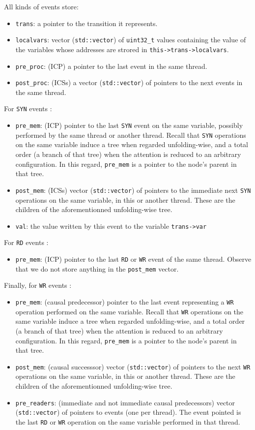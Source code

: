 \documentclass{llncs}
\begin{document}
All kinds of events store:
\begin{itemize}
\item
  \verb!trans!: a pointer to the transition it represents.
\item
  \verb!localvars!: vector (\verb!std::vector!) of \verb!uint32_t! values
  containing the value of the variables whose addresses are strored in
  \verb!this->trans->localvars!.
\item
  \verb!pre_proc!: (ICP) a pointer to the last event in the same thread.
\item
  \verb!post_proc!: (ICSs) a vector (\verb!std::vector!) of pointers to
  the next events in the same thread.
\end{itemize}
%
For \verb!SYN! events :
\begin{itemize}
\item
  \verb!pre_mem!: (ICP) pointer to the last \verb!SYN! event on the same
  variable, possibly performed by the same thread or another thread.
  Recall that \verb!SYN! operations on the same variable induce a tree when
  regarded unfolding-wise, and a total order (a branch of that tree) when
  the attention is reduced to an arbitrary configuration.
  In this regard, \verb!pre_mem! is a pointer to the node's parent in that
  tree.
\item
  \verb!post_mem!: (ICSs) vector (\verb!std::vector!) of pointers to
  the immediate next \verb!SYN! operations on the same variable, in this or
  another thread. These are the children of the aforementionned
  unfolding-wise tree.
\item
  \verb!val!: the value written by this event to the variable \verb!trans->var!
\end{itemize}
%
For \verb!RD! events :
\begin{itemize}
\item
  \verb!pre_mem!: (ICP) pointer to the last \verb!RD! or \verb!WR! event of
  the same thread. Observe that we do not store anything in the
  \verb!post_mem! vector.
\end{itemize}
%
Finally, for \verb!WR! events :
\begin{itemize}
\item
  \verb!pre_mem!: (causal predecessor) pointer to the last event
  representing a \verb!WR! operation performed on the same variable.
  Recall that \verb!WR! operations on the same variable induce a tree when
  regarded unfolding-wise, and a total order (a branch of that tree) when
  the attention is reduced to an arbitrary configuration.
  In this regard, \verb!pre_mem! is a pointer to the node's parent in that
  tree.
\item
  \verb!post_mem!: (causal successsor) vector (\verb!std::vector!) of
  pointers to the next \verb!WR! operations on the same variable, in this
  or another thread. These are the children of the aforementionned
  unfolding-wise tree.
\item
  \verb!pre_readers!: (immediate and not immediate causal predecessors)
  vector (\verb!std::vector!) of pointers to events (one per thread).
  The event pointed is the last \verb!RD! or \verb!WR! operation on the
  same variable performed in that thread.
\end{itemize}
\end{document}
